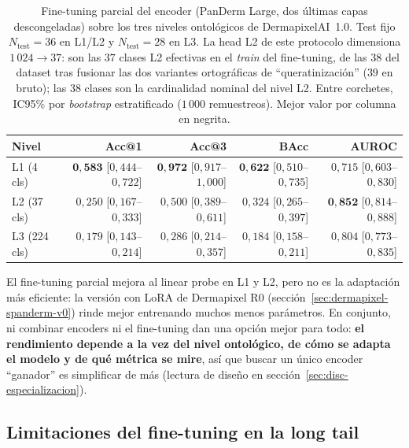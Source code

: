 \begin{table}[htbp]
\centering
\footnotesize
\setlength{\tabcolsep}{4pt}
\renewcommand{\arraystretch}{0.95}
\caption{Fine-tuning parcial del encoder (PanDerm Large, dos
últimas capas descongeladas) sobre los tres niveles ontológicos de
DermapixelAI~1.0. Test fijo $N_{\mathrm{test}} = 36$ en L1/L2 y
$N_{\mathrm{test}} = 28$ en L3. La head L2 de este protocolo
dimensiona $1\,024 \to 37$: son las $37$ clases L2 efectivas en el
\emph{train} del fine-tuning, de las $38$ del dataset tras fusionar
las dos variantes ortográficas de ``queratinización'' ($39$ en
bruto); las $38$ clases son la cardinalidad nominal del nivel L2.
Entre corchetes, IC95\% por \emph{bootstrap}
estratificado ($1\,000$ remuestreos). Mejor valor por columna en
negrita.}
\label{tab:dermapixel-ft-multilevel}
\begin{tabular}{lrrrr}
\hline
Nivel        & Acc@1                            & Acc@3                            & BAcc                             & AUROC \\
\hline
L1 (4 cls)   & $\mathbf{0{,}583}$ [$0{,}444$--$0{,}722$] & $\mathbf{0{,}972}$ [$0{,}917$--$1{,}000$] & $\mathbf{0{,}622}$ [$0{,}510$--$0{,}735$] & $0{,}715$ [$0{,}603$--$0{,}830$] \\
L2 (37 cls)  & $0{,}250$ [$0{,}167$--$0{,}333$] & $0{,}500$ [$0{,}389$--$0{,}611$] & $0{,}324$ [$0{,}265$--$0{,}397$] & $\mathbf{0{,}852}$ [$0{,}814$--$0{,}888$] \\
L3 (224 cls) & $0{,}179$ [$0{,}143$--$0{,}214$] & $0{,}286$ [$0{,}214$--$0{,}357$] & $0{,}184$ [$0{,}158$--$0{,}211$] & $0{,}804$ [$0{,}773$--$0{,}835$] \\
\hline
\end{tabular}
\end{table}

El fine-tuning parcial mejora al linear probe en L1 y L2, pero no es la
adaptación más eficiente: la versión con LoRA de Dermapixel R0
(sección~\ref{sec:dermapixel-spanderm-v0}) rinde mejor entrenando
muchos menos parámetros. En conjunto, ni combinar encoders ni el
fine-tuning dan una opción mejor para todo: \textbf{el rendimiento
depende a la vez del nivel ontológico, de cómo se adapta el modelo y de
qué métrica se mire}, así que buscar un único encoder ``ganador'' es
simplificar de más (lectura de diseño en
sección~\ref{sec:disc-especializacion}).

\subsection{Limitaciones del fine-tuning en la long tail}

